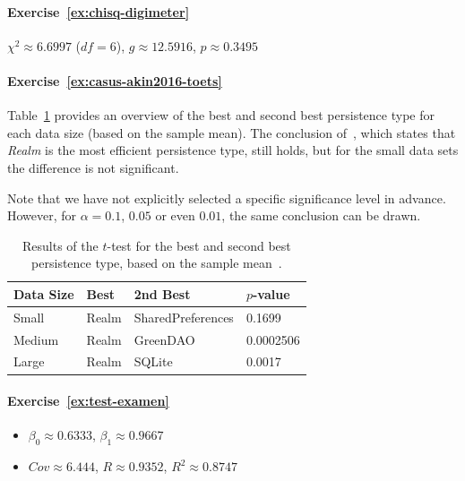 \paragraph{Exercise~\ref{ex:chisq-digimeter}} $\chi^2 \approx 6.6997$ ($df = 6$), $g \approx 12.5916$, $p \approx 0.3495$


\paragraph{Exercise~\ref{ex:casus-akin2016-toets}}

Table~\ref{tab:akin2016-results-t-test} provides an overview of the best and second best persistence type for each data size (based on the sample mean). The conclusion of~\textcite{Akin2016}, which states that \emph{Realm} is the most efficient persistence type, still holds, but for the small data sets the difference is not significant.

Note that we have not explicitly selected a specific significance level in advance. However, for $\alpha = 0.1$, $0.05$ or even $0.01$, the same conclusion can be drawn.

\begin{table}
  \begin{center}
    \begin{tabular}{llll}
      \toprule
      \textbf{Data Size} & \textbf{Best} & \textbf{2nd Best} & \textbf{$p$-value} \\ \midrule
      Small            & Realm          & SharedPreferences & 0.1699     \\
      Medium           & Realm          & GreenDAO          & 0.0002506  \\
      Large            & Realm          & SQLite            & 0.0017     \\ \bottomrule
    \end{tabular}
  \end{center}
  \caption{Results of the $t$-test for the best and second best persistence type, based on the sample mean~\autocite{Akin2016}.}
  \label{tab:akin2016-results-t-test}
\end{table}

\paragraph{Exercise~\ref{ex:test-examen}}

\begin{itemize}
  \item $\beta_{0} \approx 0.6333$, $\beta_{1} \approx 0.9667$
  \item $Cov \approx 6.444$, $R \approx 0.9352$, $R^2 \approx 0.8747$
\end{itemize}

